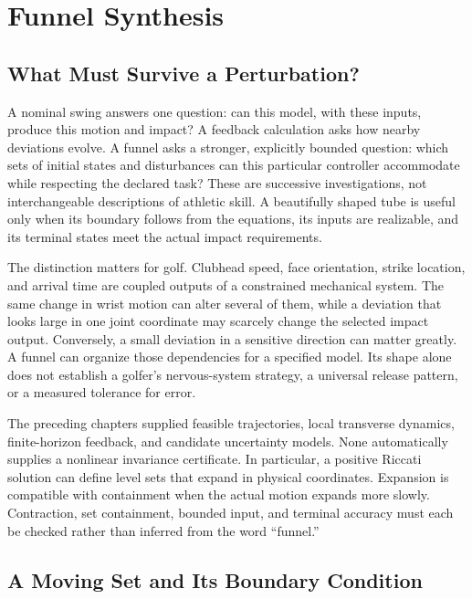 \chapter{Funnel Synthesis}
\label{ch:funnel_synthesis}

\section{What Must Survive a Perturbation?}

A nominal swing answers one question: can this model, with these inputs, produce this motion and impact? A feedback calculation asks how nearby deviations evolve. A funnel asks a stronger, explicitly bounded question: which sets of initial states and disturbances can this particular controller accommodate while respecting the declared task? These are successive investigations, not interchangeable descriptions of athletic skill. A beautifully shaped tube is useful only when its boundary follows from the equations, its inputs are realizable, and its terminal states meet the actual impact requirements.

The distinction matters for golf. Clubhead speed, face orientation, strike location, and arrival time are coupled outputs of a constrained mechanical system. The same change in wrist motion can alter several of them, while a deviation that looks large in one joint coordinate may scarcely change the selected impact output. Conversely, a small deviation in a sensitive direction can matter greatly. A funnel can organize those dependencies for a specified model. Its shape alone does not establish a golfer's nervous-system strategy, a universal release pattern, or a measured tolerance for error.

The preceding chapters supplied feasible trajectories, local transverse dynamics, finite-horizon feedback, and candidate uncertainty models. None automatically supplies a nonlinear invariance certificate. In particular, a positive Riccati solution can define level sets that expand in physical coordinates. Expansion is compatible with containment when the actual motion expands more slowly. Contraction, set containment, bounded input, and terminal accuracy must each be checked rather than inferred from the word ``funnel.''

\section{A Moving Set and Its Boundary Condition}

